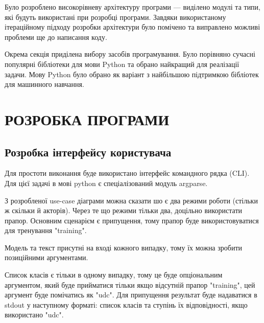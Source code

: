 \documentclass[14pt]{extarticle}
\let\oldsection\section
\renewcommand{\section}{\clearpage\oldsection}
\begin{document}
  Було розроблено високорівневу архітектуру програми ---
  виділено модулі та типи, які будуть використані при розробці програми.
  Завдяки використаному ітераційному підходу розробки
  архітектури було помічено та виправлено можливі проблеми ще до написання коду.

  Окрема секція приділена вибору засобів програмування.
  Було порівняно сучасні популярні бібліотеки для мови Python
  та обрано найкращий для реалізації задачи.
  Мову Python було обрано як варіант з найбільшою підтримкою бібліотек
  для машинного навчання.

  \section{РОЗРОБКА ПРОГРАМИ}
  \subsection{Розробка інтерфейсу користувача}
  Для простоти виконання буде використано інтерфейс командного рядка (CLI). 
  Для цієї задачі в мові python є спеціалізований модуль argparse.

  З розробленої use-case діаграми можна сказати шо є два режими роботи
  (стільки  ж скільки й акторів).
  Через те що режими тільки два, доцільно використати прапор.
  Основним сценарієм є припущення,
  тому прапор буде використовуватися для тренування "\-\-training".
  
  Модель та текст присутні на вході кожного випадку,
  тому їх можна зробити позиційними аргументами.
  
  Список класів є тільки в одному випадку,
  тому це буде опціональним аргументом,
  який буде прийматися тільки якщо відсутній прапор "\-\-training",
  цей аргумент буде помічатись як "\-\-udc".
  Для припущення результат буде надаватися в stdout у наступному форматі:
  список класів та ступінь їх відповідності, якщо використано "\-\-udc".
  
\end{document}
